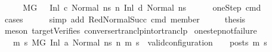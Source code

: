 \begin{isabellebody}
%
\isadelimproof
%
\endisadelimproof
%
\isatagproof
{}\isamarkupfalse%
\ {\isacharminus}{\kern0pt}\isanewline
\ \ \isamarkupfalse%
\ {\isachardoublequoteopen}M{\isacharcomma}{\kern0pt}{\isasymLambda}{\isacharcomma}{\kern0pt}{\isasymGamma}{\isacharcomma}{\kern0pt}{\isasymOmega}{\isacharcomma}{\kern0pt}G{\isacharprime}{\kern0pt}\ \ {\isasymturnstile}\ {\isacharparenleft}{\kern0pt}Inl\ c{\isacharcomma}{\kern0pt}\ Normal\ ns{\isacharparenright}{\kern0pt}\ {\isacharminus}{\kern0pt}n{\isasymrightarrow}\ {\isacharparenleft}{\kern0pt}Inl\ d{\isacharcomma}{\kern0pt}\ Normal\ ns{\isacharprime}{\kern0pt}{\isacharparenright}{\kern0pt}{\isachardoublequoteclose}\isanewline
\ \ \ \ \isamarkupfalse%
\ oneStep\ cmd\isanewline
\ \ \ \ \isamarkupfalse%
\ {\isacharparenleft}{\kern0pt}cases{\isacharparenright}{\kern0pt}\isanewline
\ \ \ \ \isamarkupfalse%
\ {\isacharparenleft}{\kern0pt}simp\ add{\isacharcolon}{\kern0pt}\ RedNormalSucc\ cmd\ member{\isacharparenright}{\kern0pt}\isanewline
\isanewline
\ \ \isamarkupfalse%
\ \isamarkupfalse%
\ {\isacharquery}{\kern0pt}thesis\ \isanewline
\ \ \ \ \isamarkupfalse%
\ {\isacharparenleft}{\kern0pt}meson\ targetVerifies\ converse{\isacharunderscore}{\kern0pt}rtranclp{\isacharunderscore}{\kern0pt}into{\isacharunderscore}{\kern0pt}rtranclp{\isacharparenright}{\kern0pt}\isanewline
{}\isamarkupfalse%
%
\endisatagproof
{\isafoldproof}%
%
\isadelimproof
\isanewline
%
\endisadelimproof
\isanewline
{}\isamarkupfalse%
\ one{\isacharunderscore}{\kern0pt}step{\isacharunderscore}{\kern0pt}not{\isacharunderscore}{\kern0pt}failure{\isacharcolon}{\kern0pt}\isanewline
\ \ \ {\isachardoublequoteopen}{\isacharparenleft}{\kern0pt}{\isasymforall}m{}{\isacharprime}{\kern0pt}\ s{}{\isacharprime}{\kern0pt}{\isachardot}{\kern0pt}\ {\isacharparenleft}{\kern0pt}M{\isacharcomma}{\kern0pt}{\isasymLambda}{\isacharcomma}{\kern0pt}{\isasymGamma}{\isacharcomma}{\kern0pt}{\isasymOmega}{\isacharcomma}{\kern0pt}G{\isacharprime}{\kern0pt}\ {\isasymturnstile}{\isacharparenleft}{\kern0pt}Inl\ a{\isacharcomma}{\kern0pt}\ Normal\ ns{\isacharparenright}{\kern0pt}\ {\isacharminus}{\kern0pt}n{\isasymrightarrow}{\isacharasterisk}{\kern0pt}\ {\isacharparenleft}{\kern0pt}m{}{\isacharprime}{\kern0pt}{\isacharcomma}{\kern0pt}\ s{}{\isacharprime}{\kern0pt}{\isacharparenright}{\kern0pt}{\isacharparenright}{\kern0pt}\ {\isasymlongrightarrow}\ valid{\isacharunderscore}{\kern0pt}configuration\ {\isasymLambda}\ {\isasymGamma}\ {\isasymOmega}\ posts\ m{}{\isacharprime}{\kern0pt}\ s{}{\isacharprime}{\kern0pt}{\isacharparenright}{\kern0pt}{\isachardoublequoteclose}\isanewline

\end{isabellebody}
